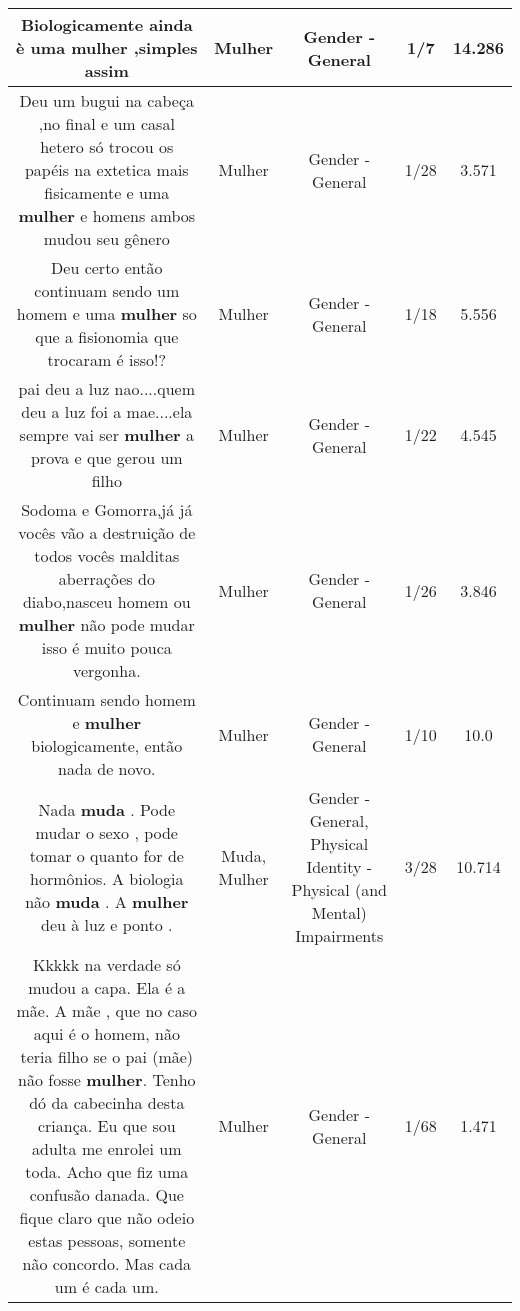 \documentclass[11pt]{article}
\newlength\mylength
\begin{document}
\begin{center}
\begin{longtable}{|C{.65\mylength}|C{.30\mylength}|C{.12\mylength}|C{.12\mylength}|C{.12\mylength}|}
  \small Biologicamente ainda è uma \textbf{mulher} ,simples assim\normalsize   & Mulher & Gender - General & 1/7 & 14.286 \\  \hline
  \small Deu um bugui na cabeça ,no final e um casal hetero só trocou os papéis na extetica mais fisicamente e uma \textbf{mulher} e homens ambos mudou seu gênero\normalsize   & Mulher & Gender - General & 1/28 & 3.571 \\  \hline
  \small Deu certo então continuam sendo um homem e uma \textbf{mulher} so que a fisionomia que trocaram é isso!?\normalsize   & Mulher & Gender - General & 1/18 & 5.556 \\  \hline
  \small pai deu a luz nao....quem deu a luz foi a mae....ela sempre vai ser \textbf{mulher} a prova e que gerou um filho\normalsize   & Mulher & Gender - General & 1/22 & 4.545 \\  \hline
  \small Sodoma e Gomorra,já já vocês vão a destruição de todos vocês malditas aberrações do diabo,nasceu homem ou \textbf{mulher} não pode mudar isso é muito pouca vergonha.\normalsize   & Mulher & Gender - General & 1/26 & 3.846 \\  \hline
  \small Continuam sendo homem e \textbf{mulher} biologicamente, então nada de novo.\normalsize   & Mulher & Gender - General & 1/10 & 10.0 \\  \hline
  \small Nada \textbf{muda} . Pode mudar o sexo , pode tomar o quanto for de hormônios. A biologia não \textbf{muda} . A \textbf{mulher} deu à luz e ponto .\normalsize   & Muda, Mulher & Gender - General, Physical Identity - Physical (and Mental) Impairments & 3/28 & 10.714 \\  \hline
  \small Kkkkk na verdade só mudou a capa. Ela é a mãe. A mãe , que no caso aqui é o homem, não teria filho se o pai (mãe) não fosse \textbf{mulher}.  Tenho dó da cabecinha desta criança. Eu que sou adulta me enrolei um toda. Acho que fiz uma confusão danada. Que fique claro que não odeio estas pessoas, somente não concordo. Mas cada um é cada um.\normalsize   & Mulher & Gender - General & 1/68 & 1.471 \\  \hline

\end{longtable}
\end{center}
\end{document}
